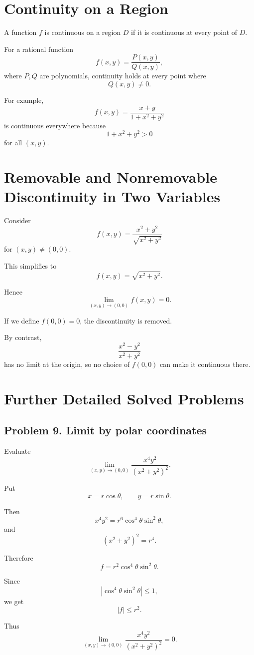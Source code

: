 \documentclass[11pt,oneside]{book}
\theoremstyle{studentthm}
\theoremstyle{definition}
\begin{document}
\section{Continuity on a Region}

A function \(f\) is continuous on a region \(D\) if it is continuous
at every point of \(D\).

For a rational function
\[
f(x,y)=\frac{P(x,y)}{Q(x,y)},
\]
where \(P,Q\) are polynomials, continuity holds at every point where
\[
Q(x,y)\ne0.
\]

For example,
\[
f(x,y)=\frac{x+y}{1+x^2+y^2}
\]
is continuous everywhere because
\[
1+x^2+y^2>0
\]
for all \((x,y)\).

\section{Removable and Nonremovable Discontinuity in Two Variables}

Consider
\[
f(x,y)
=
\frac{x^2+y^2}{\sqrt{x^2+y^2}}
\]
for \((x,y)\ne(0,0)\).

This simplifies to
\[
f(x,y)=\sqrt{x^2+y^2}.
\]

Hence
\[
\lim_{(x,y)\to(0,0)}f(x,y)=0.
\]

If we define \(f(0,0)=0\), the discontinuity is removed.

By contrast,
\[
\frac{x^2-y^2}{x^2+y^2}
\]
has no limit at the origin, so no choice of \(f(0,0)\) can make it
continuous there.

\section{Further Detailed Solved Problems}

\subsection*{Problem 9. Limit by polar coordinates}

Evaluate
\[
\lim_{(x,y)\to(0,0)}
\frac{x^4y^2}{(x^2+y^2)^2}.
\]

Put
\[
x=r\cos\theta,\qquad y=r\sin\theta.
\]

Then
\[
x^4y^2
=
r^6\cos^4\theta\sin^2\theta,
\]
and
\[
(x^2+y^2)^2=r^4.
\]

Therefore
\[
f
=
r^2\cos^4\theta\sin^2\theta.
\]

Since
\[
|\cos^4\theta\sin^2\theta|\le1,
\]
we get
\[
|f|\le r^2.
\]

Thus
\[
\lim_{(x,y)\to(0,0)}
\frac{x^4y^2}{(x^2+y^2)^2}=0.
\]
\end{document}
